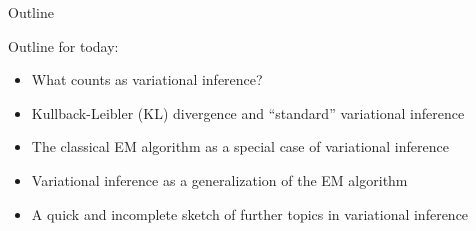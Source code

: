 
\begin{frame}{Outline}

Outline for today:

\begin{itemize}
    \item What counts as variational inference?
    \item Kullback-Leibler (KL) divergence and ``standard'' variational inference
    \item The classical EM algorithm as a special case of variational inference
    \item Variational inference as a generalization of the EM algorithm
    \item A quick and incomplete sketch of further topics in variational inference
\end{itemize}

\end{frame}
